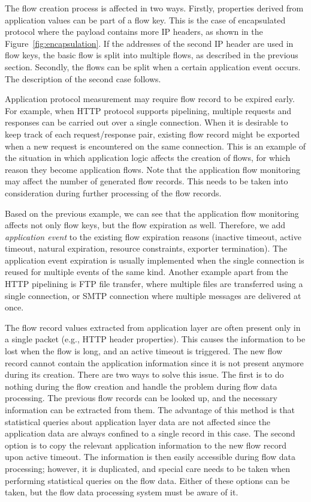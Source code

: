 The flow creation process is affected in two ways. Firstly, properties derived from application values can be part of a flow key. This is the case of encapsulated protocol where the payload contains more IP headers, as shown in the Figure~\ref{fig:encapsulation}. If the addresses of the second IP header are used in flow keys, the basic flow is split into multiple flows, as described in the previous section. Secondly, the flows can be split when a certain application event occurs. The description of the second case follows.

Application protocol measurement may require flow record to be expired early. For example, when HTTP protocol supports pipelining, multiple requests and responses can be carried out over a single connection. When it is desirable to keep track of each request/response pair, existing flow record might be exported when a new request is encountered on the same connection. This is an example of the situation in which application logic affects the creation of flows, for which reason they become application flows. Note that the application flow monitoring may affect the number of generated flow records. This needs to be taken into consideration during further processing of the flow records.

Based on the previous example, we can see that the application flow monitoring affects not only flow keys, but the flow expiration as well. Therefore, we add \emph{application event} to the existing flow expiration reasons (inactive timeout, active timeout, natural expiration, resource constraints, exporter termination). The application event expiration is usually implemented when the single connection is reused for multiple events of the same kind. Another example apart from the HTTP pipelining is FTP file transfer, where multiple files are transferred using a single connection, or SMTP connection where multiple messages are delivered at once.

The flow record values extracted from application layer are often present only in a single packet (e.g., HTTP header properties). This causes the information to be lost when the flow is long, and an active timeout is triggered. The new flow record cannot contain the application information since it is not present anymore during its creation. There are two ways to solve this issue. The first is to do nothing during the flow creation and handle the problem during flow data processing. The previous flow records can be looked up, and the necessary information can be extracted from them. The advantage of this method is that statistical queries about application layer data are not affected since the application data are always confined to a single record in this case. The second option is to copy the relevant application information to the new flow record upon active timeout. The information is then easily accessible during flow data processing; however, it is duplicated, and special care needs to be taken when performing statistical queries on the flow data. Either of these options can be taken, but the flow data processing system must be aware of it.

